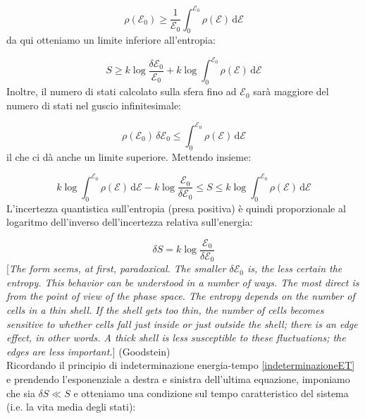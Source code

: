 \documentclass[a4paper]{report}
\begin{document}
\begin{equation}
    \rho(\mathcal{E}_0) \geq \frac{1}{\mathcal{E}_0}\int_0^{\mathcal{E}_0}\rho(\mathcal{E})\,\mathrm{d}\mathcal{E}
\end{equation}
da qui otteniamo un limite inferiore all'entropia:

\begin{equation}
    S \geq k\log\frac{\delta \mathcal{E}_0}{\mathcal{E}_0}+k\log\int_0^{\mathcal{E}_0}\rho(\mathcal{E})\,\mathrm{d}\mathcal{E}
\end{equation}
Inoltre, il numero di stati calcolato sulla sfera fino ad $\mathcal{E}_0$ sarà maggiore del numero di stati nel guscio infinitesimale:

\begin{equation}
    \rho(\mathcal{E}_0)\,\delta\mathcal{E}_0 \leq \int_0^{\mathcal{E}_0}\rho(\mathcal{E})\,\mathrm{d}\mathcal{E}
\end{equation}
il che ci dà anche un limite superiore. Mettendo insieme:

\begin{equation}
   k\log\int_0^{\mathcal{E}_0}\rho(\mathcal{E})\,\mathrm{d}\mathcal{E} - k\log\frac{\mathcal{E}_0}{\delta\mathcal{E}_0} \leq S \leq k\log\int_0^{\mathcal{E}_0}\rho(\mathcal{E})\,\mathrm{d}\mathcal{E}  
\end{equation}
L'incertezza quantistica sull'entropia (presa positiva) è quindi proporzionale al logaritmo dell'inverso dell'incertezza relativa sull'energia:

\begin{equation}
    \delta S = k \log \frac{\mathcal{E}_0}{\delta \mathcal{E}_0}
\end{equation}
[\textit{The form seems, at first, paradoxical. The smaller $\delta \mathcal{E}_0$ is, the less certain the entropy. This behavior can be understood in a number of ways. The most direct is from the point of view of the phase space. The entropy depends on the number of cells in a thin shell. If the shell gets too thin, the number of cells becomes sensitive to whether cells  fall just inside or just outside the shell; there is an edge effect, in other words. A thick shell is less susceptible to these fluctuations; the edges are less important.}] (Goodstein) \\
Ricordando il principio di indeterminazione energia-tempo \eqref{indeterminazioneET} e prendendo l'esponenziale a destra e sinistra dell'ultima equazione, imponiamo che sia $\delta S \ll S$ e otteniamo una condizione sul tempo caratteristico del sistema (i.e. la vita media degli stati):
\end{document}
